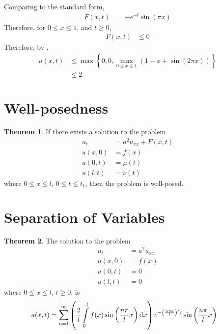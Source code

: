 \documentclass[titlepage, fleqn, a4paper, 12pt, twoside]{article}
\theoremstyle{definition}
\theoremstyle{theorem}
\newtheorem{theorem}{Theorem}
\begin{document}
\begin{solution}
	Comparing to the standard form,
	\begin{align*}
		F(x,t) & = -e^{-t} \sin (\pi x)
	\end{align*}
	Therefore, for $0 \le x \le 1$, and $t \ge 0$,
	\begin{align*}
		F(x,t) & \le 0
	\end{align*}
	Therefore, by ,
	\begin{align*}
		u(x,t) & \le \max\limits\left\{ 0 , 0 , \max\limits_{0 \le x \le 1 } \left( 1 - x + \sin(2 \pi x) \right) \right\} \\
                       & \le 2
	\end{align*}
\end{solution}

\section{Well-posedness}

\begin{theorem}
	If there exists a solution to the problem
	\begin{align*}
		u_t    & = a^2 u_{x x} + F(x,t) \\
		u(x,0) & = f(x)                 \\
		u(0,t) & = \mu(t)               \\
		u(l,t) & = \nu(t)
	\end{align*}
	where $0 \le x \le l$, $0 \le t \le t_1$, then the problem is well-posed.
\end{theorem}

\section{Separation of Variables}

\begin{theorem}
	The solution to the problem
	\begin{align*}
		u_t    & = a^2 u_{x x} \\
		u(x,0) & = f(x)        \\
		u(0,t) & = 0           \\
		u(l,t) & = 0
	\end{align*}
	where $0 \le x \le l$, $t \ge 0$, is
	\begin{align*}
		u(x,t) & = \sum\limits_{n = 1}^{\infty} \left( \frac{2}{l} \int\limits_{0}^{l} f(x) \sin\left( \frac{n \pi}{l} x \right) \dif x \right) e^{-\left( \frac{n \pi a}{l} \right)^2 t} \sin\left( \frac{n \pi}{l} x \right)
	\end{align*}
\end{theorem}
\end{document}
